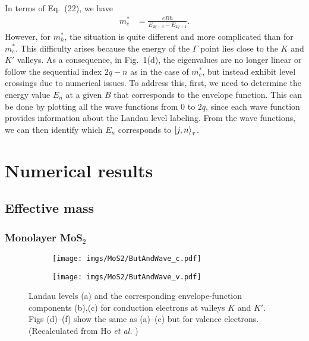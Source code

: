 \documentclass{article}
\begin{document}
In terms of Eq.~(22), we have
\begin{equation}
	\begin{aligned}
		m_{e}^{*} & = \frac{e B \hbar}{E_{2q+3} - E_{2q+1}}.
	\end{aligned}
\end{equation}
However, for $m_{h}^{*}$, the situation is quite different and more complicated than for $m_{e}^{*}$. This difficulty arises because the energy of the $\Gamma$ point lies close to the $K$ and $K'$ valleys. 
As a consequence, in Fig.~1(d), the eigenvalues are no longer linear or follow the sequential index $2q-n$ as in the case of $m_{e}^{*}$, but instead exhibit level crossings due to numerical issues. 
To address this, first, we need to determine the energy value $E_{n}$ at a given $B$ that corresponds to the envelope function. 
This can be done by plotting all the wave functions from $0$ to $2q$, since each wave function provides information about the Landau level labeling. 
From the wave functions, we can then identify which $E_{n}$ corresponds to $\ket{j,n}_{\tau}$.







\newpage
\section{Numerical results}
\subsection{Effective mass}
\subsubsection*{Monolayer MoS$_{2}$}

\begin{figure}[htb]
	\begin{subfigure}{0.495\textwidth}
		\centering
		\texttt{[image: imgs/MoS2/ButAndWave\_c.pdf]}
	\end{subfigure}
	\begin{subfigure}{0.495\textwidth}
		\centering
		\texttt{[image: imgs/MoS2/ButAndWave\_v.pdf]}
	\end{subfigure}
	\caption{Landau levels (a) and the corresponding envelope-function components (b),(c) for conduction electrons at valleys $K$ and $K'$. Figs (d)–(f) show the same as (a)–(c) but for valence electrons. (Recalculated from Ho \textit{et al.} \cite{ho2014})}
\end{figure}
\end{document}
